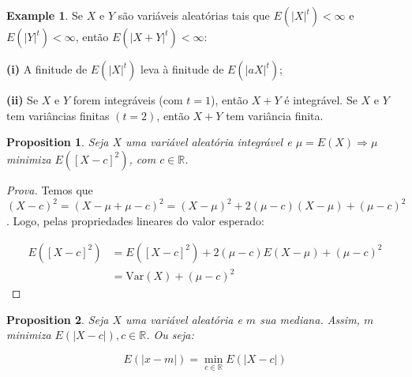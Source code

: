 \documentclass[
]{article}
\newtheorem{proposition}{Proposition}[section]
\theoremstyle{definition}
\theoremstyle{definition}
\newtheorem{example}{Example}[section]
\theoremstyle{definition}
\theoremstyle{definition}
\theoremstyle{remark}
\begin{document}
\begin{example}
Se \(X\) e \(Y\) são variáveis aleatórias tais que \(E(|X|^{t}) < \infty\) e \(E(|Y|^{t}) < \infty\), então \(E(|X + Y|^{t}) < \infty\):

\textbf{(i)} A finitude de \(E(|X|^{t})\) leva à finitude de \(E(|aX|^{t})\);

\textbf{(ii)} Se \(X\) e \(Y\) forem integráveis (com \(t = 1\)), então \(X + Y\) é integrável. Se \(X\) e \(Y\) tem variâncias finitas \((t = 2)\), então \(X + Y\) tem variância finita.
\end{example}

\begin{proposition}
Seja \(X\) uma variável aleatória integrável e \(\mu = E(X) \Rightarrow \mu\) minimiza \(E([X - c]^{2})\), com \(c \in \mathbb{R}\).
\end{proposition}

\begin{proof}[Prova]
Temos que \((X - c)^{2} = (X - \mu + \mu - c)^{2} = (X - \mu)^{2} + 2(\mu - c)(X - \mu) + (\mu - c)^{2}\). Logo, pelas propriedades lineares do valor esperado:

\begin{align*}
E([X - c]^{2}) &= E([X - c]^{2}) + 2(\mu - c)E(X - \mu) + (\mu - c)^{2} \\
&= \mathrm{Var}(X) + (\mu - c)^{2}
\end{align*}
\end{proof}

\begin{proposition}
Seja \(X\) uma variável aleatória e \(m\) sua mediana. Assim, \(m\) minimiza \(E(|X - c|), c \in \mathbb{R}\). Ou seja:

\begin{equation*}
E(|x - m|) = \min_{c \in \mathbb{R}}E(|X - c|)
\end{equation*}
\end{proposition}
\end{document}
